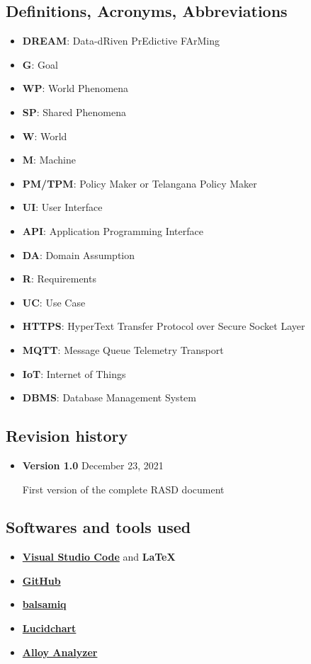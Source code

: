\documentclass[10pt]{article}
\begin{document}
\subsection{Definitions, Acronyms, Abbreviations}
\begin{itemize}
    \item \textbf{DREAM}: Data-dRiven PrEdictive FArMing
    \item \textbf{G}: Goal
    \item \textbf{WP}: World Phenomena
    \item \textbf{SP}: Shared Phenomena
    \item \textbf{W}: World
    \item \textbf{M}: Machine
    \item \textbf{PM/TPM}: Policy Maker or Telangana Policy Maker
    \item \textbf{UI}: User Interface
    \item \textbf{API}: Application Programming Interface
    \item \textbf{DA}: Domain Assumption
    \item \textbf{R}: Requirements
    \item \textbf{UC}: Use Case
    \item \textbf{HTTPS}: HyperText Transfer Protocol over Secure Socket Layer
    \item \textbf{MQTT}: Message Queue Telemetry Transport
    \item \textbf{IoT}: Internet of Things
    \item \textbf{DBMS}: Database Management System
\end{itemize}
\subsection{Revision history}
\begin{itemize}
    \item \textbf{Version 1.0} December 23, 2021
    \begin{itemize}
        First version of the complete RASD document
    \end{itemize} 
\end{itemize}
\subsection{Softwares and tools used}
\begin{itemize}
    \item \href{https://visualstudio.microsoft.com/it/}{\textbf{Visual Studio Code}} and {\textbf{\LaTeX}}
    \item \href{https://github.com}{\textbf{GitHub}}
    \item \href{https://balsamiq.com}{\textbf{balsamiq}}
    \item \href{https://www.lucidchart.com}{\textbf{Lucidchart}}
    \item \href{https://alloytools.org/}{\textbf{Alloy Analyzer}}
\end{itemize}
\end{document}
